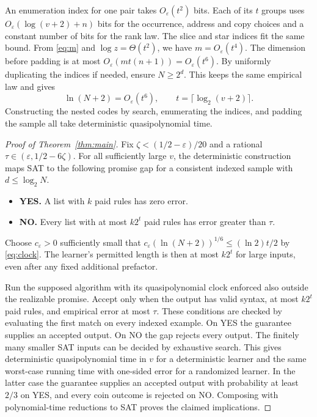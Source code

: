 \documentclass[11pt]{article}
\begin{document}
An enumeration index for one pair takes $O_\varepsilon(t^2)$ bits.
Each of its $t$ groups uses $O_\varepsilon(\log(v+2)+n)$ bits for
the occurrence, address and copy choices and a constant number
of bits for the rank law. The slice and star indices fit the same
bound. From \eqref{eq:m} and $\log z=\Theta(t^2)$, we have
$m=O_\varepsilon(t^4)$. The dimension before padding is at most
$O_\varepsilon(mt(n+1))=O_\varepsilon(t^6)$.
By uniformly duplicating the indices if needed, ensure $N\ge2^d$.
This keeps the same empirical law and gives
\begin{equation}\label{eq:clock}
  \ln(N+2)=O_\varepsilon(t^6),\qquad
  t=\lceil\log_2(v+2)\rceil .
\end{equation}
Constructing the nested codes by search, enumerating the indices,
and padding the sample all take deterministic quasipolynomial time.

\begin{proof}[Proof of Theorem~\ref{thm:main}]
Fix $\zeta<(1/2-\varepsilon)/20$ and a rational
$\tau\in(\varepsilon,1/2-6\zeta)$.
For all sufficiently large $v$, the deterministic construction
maps SAT to the following promise gap for a consistent indexed
sample with $d\le\log_2N$.
\begin{itemize}
  \item \textbf{YES.} A list with $k$ paid rules has zero error.
  \item \textbf{NO.} Every list with at most $k2^t$ paid rules
        has error greater than $\tau$.
\end{itemize}
Choose $c_\varepsilon>0$ sufficiently small that
$c_\varepsilon(\ln(N+2))^{1/6}\le(\ln2)t/2$ by \eqref{eq:clock}.
The learner's permitted length is then at most $k2^t$ for
large inputs, even after any fixed additional prefactor.

Run the supposed algorithm with its quasipolynomial clock enforced
also outside the realizable promise. Accept only when the output
has valid syntax, at most $k2^t$ paid rules, and empirical error at
most $\tau$. These conditions are checked by evaluating the first
match on every indexed example. On YES the guarantee supplies an
accepted output. On NO the gap rejects every output. The finitely
many smaller SAT inputs can be decided by exhaustive search.
This gives deterministic quasipolynomial time in $v$ for a
deterministic learner and the same worst-case running time with
one-sided error for a randomized learner. In the latter case
the guarantee supplies an accepted output with probability at
least $2/3$ on YES, and every coin outcome is rejected on NO.
Composing with polynomial-time reductions to SAT proves the
claimed implications.
\end{proof}
\end{document}

